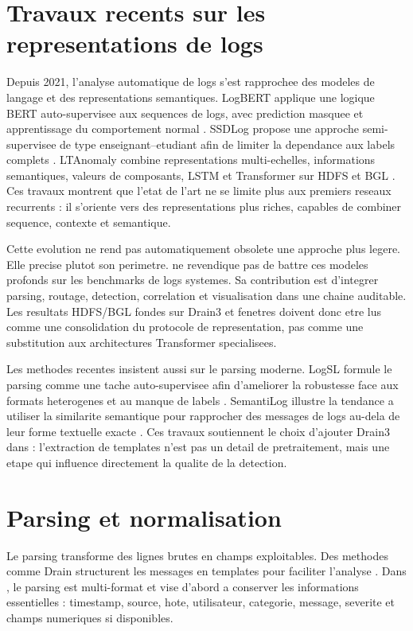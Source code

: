 \section{Travaux recents sur les representations de logs}
Depuis 2021, l'analyse automatique de logs s'est rapprochee des modeles de langage et des representations semantiques. LogBERT applique une logique BERT auto-supervisee aux sequences de logs, avec prediction masquee et apprentissage du comportement normal \cite{guo2021logbert}. SSDLog propose une approche semi-supervisee de type enseignant--etudiant afin de limiter la dependance aux labels complets \cite{lu2023ssdlog}. LTAnomaly combine representations multi-echelles, informations semantiques, valeurs de composants, LSTM et Transformer sur HDFS et BGL \cite{han2023ltanomaly}. Ces travaux montrent que l'etat de l'art ne se limite plus aux premiers reseaux recurrents : il s'oriente vers des representations plus riches, capables de combiner sequence, contexte et semantique.

Cette evolution ne rend pas automatiquement obsolete une approche plus legere. Elle precise plutot son perimetre. \logminer{} ne revendique pas de battre ces modeles profonds sur les benchmarks de logs systemes. Sa contribution est d'integrer parsing, routage, detection, correlation et visualisation dans une chaine auditable. Les resultats HDFS/BGL fondes sur Drain3 et fenetres doivent donc etre lus comme une consolidation du protocole de representation, pas comme une substitution aux architectures Transformer specialisees.

Les methodes recentes insistent aussi sur le parsing moderne. LogSL formule le parsing comme une tache auto-supervisee afin d'ameliorer la robustesse face aux formats heterogenes et au manque de labels \cite{cao2024logsl}. SemantiLog illustre la tendance a utiliser la similarite semantique pour rapprocher des messages de logs au-dela de leur forme textuelle exacte \cite{shavit2024semantilog}. Ces travaux soutiennent le choix d'ajouter Drain3 dans \logminer{} : l'extraction de templates n'est pas un detail de pretraitement, mais une etape qui influence directement la qualite de la detection.

\section{Parsing et normalisation}
Le parsing transforme des lignes brutes en champs exploitables. Des methodes comme Drain structurent les messages en templates pour faciliter l'analyse \cite{he2016drain}. Dans \logminer, le parsing est multi-format et vise d'abord a conserver les informations essentielles : timestamp, source, hote, utilisateur, categorie, message, severite et champs numeriques si disponibles.

